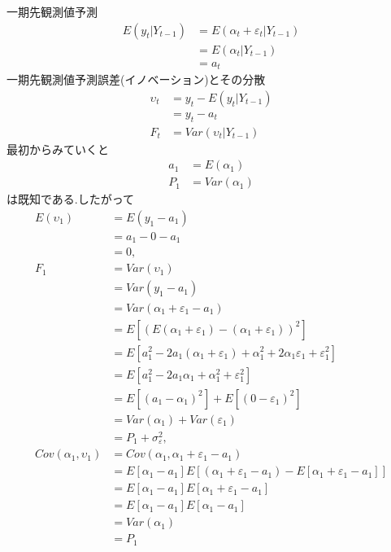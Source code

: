\documentclass[uplatex]{jsarticle}
\begin{document}
一期先観測値予測
\begin{align*}
  E(y_{t}|Y_{t-1})&=E(\alpha_{t}+\varepsilon_{t}|Y_{t-1})\\
				  &=E(\alpha_{t}|Y_{t-1})\\
				  &=a_{t}
\end{align*}
一期先観測値予測誤差(イノベーション)とその分散
\begin{align*}
  \upsilon_{t}&=y_{t}- E(y_{t}|Y_{t-1})\\
			  &=y_{t}-a_{t}\\
  F_{t}&=Var(\upsilon_{t}|Y_{t-1})
\end{align*}
\newpage
最初からみていくと
\begin{align*}
  a_{1}&=E(\alpha_{1})\\
  P_{1}&=Var(\alpha_{1})
\end{align*}
は既知である.したがって
\begin{align*}
  E(\upsilon_{1})&=E(y_{1}-a_{1})\\
				 &=a_{1}-0-a_{1}\\
				 &=0,\\
  F_{1}&=Var(\upsilon_{1})\\
	   &=Var(y_{1}-a_{1})\\
       &=Var(\alpha_{1}+\varepsilon_{1}-a_{1})\\
       &=E[(E(\alpha_{1}+\varepsilon_{1})-(\alpha_{1}+\varepsilon_{1}))^{2}]\\
       &=E[a_{1}^{2}-2a_{1}(\alpha_{1}+\varepsilon_{1})+\alpha_{1}^{2}+2\alpha_{1}\varepsilon_{1}+\varepsilon_{1}^{2}]\\
       &=E[a_{1}^{2}-2a_{1}\alpha_{1}+\alpha_{1}^{2}+\varepsilon_{1}^{2}]\\
       &=E[(a_{1}-\alpha_{1})^{2}]+E[(0-\varepsilon_{1})^{2}]\\
       &=Var(\alpha_{1})+Var(\varepsilon_{1})\\
       &=P_{1}+\sigma_{\varepsilon}^{2},\\
  Cov(\alpha_{1},\upsilon_{1})&=Cov(\alpha_{1},\alpha_{1}+\varepsilon_{1}-a_{1})\\
  &=E[\alpha_{1}-a_{1}]E[(\alpha_{1}+\varepsilon_{1}-a_{1})-E[\alpha_{1}+\varepsilon_{1}-a_{1}]]\\
  &=E[\alpha_{1}-a_{1}]E[\alpha_{1}+\varepsilon_{1}-a_{1}]\\
  &=E[\alpha_{1}-a_{1}]E[\alpha_{1}-a_{1}]\\
  &=Var(\alpha_{1})\\
  &=P_{1}
\end{align*}
\end{document}
